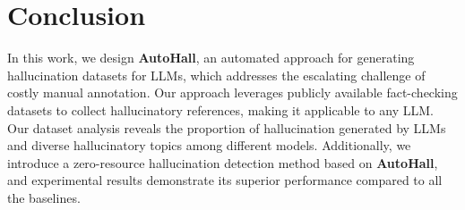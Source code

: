 \section{Conclusion}


In this work, we design \textbf{AutoHall}, an automated approach for generating hallucination datasets for LLMs, which addresses the escalating challenge of costly manual annotation. Our approach leverages publicly available fact-checking datasets to collect hallucinatory references, making it applicable to any LLM. Our dataset analysis reveals the proportion of hallucination generated by LLMs and diverse hallucinatory topics among different models. Additionally, we introduce a zero-resource hallucination detection method based on \textbf{AutoHall}, and experimental results demonstrate its superior performance compared to all the baselines.

